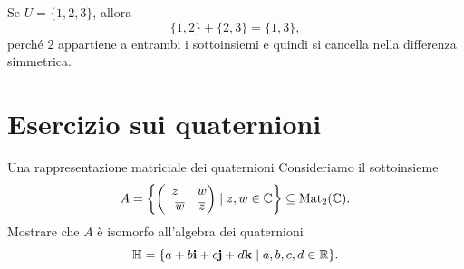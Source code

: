 \documentclass[a4paper]{article}
\begin{document}
\begin{radioactive}
\begin{snippetexample}{}
    Se \(U=\{1,2,3\}\), allora
    \[
        \{1,2\}+\{2,3\}
        =
        \{1,3\},
    \]
    perché \(2\) appartiene a entrambi i sottoinsiemi e quindi si cancella nella differenza simmetrica.
\end{snippetexample}
\end{radioactive}

\section{Esercizio sui quaternioni}

\begin{radioactive}
\begin{snippetexercise}{Una rappresentazione matriciale dei quaternioni}
    Consideriamo il sottoinsieme
    \[
        A=
        \left\{
            \begin{pmatrix}
                z & w\\
                -\overline{w} & \overline{z}
            \end{pmatrix}
            \mid
            z,w\in \mathbb{C}
        \right\}
        \subseteq
        \operatorname{Mat}_2(\mathbb{C}).
    \]
    Mostrare che \(A\) è isomorfo all'algebra dei quaternioni
    \[
        \mathbb{H}
        =
        \{a+b\mathbf{i}+c\mathbf{j}+d\mathbf{k}\mid a,b,c,d\in\mathbb{R}\}.
    \]
\end{snippetexercise}
\end{radioactive}
\end{document}
